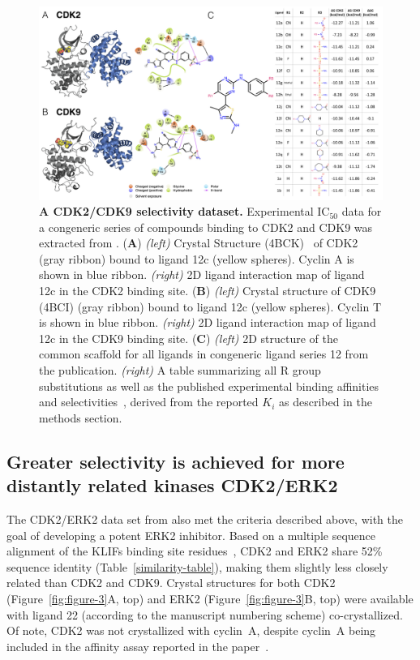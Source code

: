 \documentclass[phd,tocprelim]{cornell}
\begin{document}
\begin{landscape}
\begin{figure}[p]
\centering
	\includegraphics[width=1.0\linewidth]{figures/figure2.png}
	\caption[A CDK2/CDK9 selectivity dataset.]{{\bf A CDK2/CDK9 selectivity dataset.}
		Experimental IC$_{50}$ data for a congeneric series of compounds binding to CDK2 and CDK9 was extracted from \citet{Shao2013-oe}.
		({\bf A})  \emph{(left)} Crystal Structure (4BCK)~\citep{Hole2013-sr} of CDK2 (gray ribbon)  bound to ligand 12c (yellow spheres). 
		Cyclin A is shown in blue ribbon.
		\emph{(right)} 2D ligand interaction map of ligand 12c in the CDK2 binding site. 
		({\bf B}) \emph{(left)} Crystal structure of CDK9 (4BCI)\citep{Hole2013-sr} (gray ribbon) bound to ligand 12c (yellow spheres). 
		Cyclin T is shown in blue ribbon. 
		\emph{(right)} 2D ligand interaction map of ligand 12c in the CDK9 binding site.
		({\bf C}) \emph{(left)} 2D structure of the common scaffold for all ligands in congeneric ligand series 12 from the publication.
		\emph{(right)} A table summarizing all R group substitutions as well as the published experimental binding affinities and selectivities~\citep{Shao2013-oe}, derived from the reported $K_i$ as described in the methods section. 
	}
	\label{fig:figure-2}
\end{figure}
\end{landscape}

\subsection{Greater selectivity is achieved for more distantly related kinases CDK2/ERK2}
The CDK2/ERK2 data set from \citet{Blake2016-su} also met the criteria described above, with the goal of developing a potent ERK2 inhibitor. 
Based on a multiple sequence alignment of the KLIFs binding site residues~\cite{Kooistra:2016fr,vanLinden:2014ea}, CDK2 and ERK2 share 52\% sequence identity (Table~\ref{similarity-table}), making them slightly less closely related than CDK2 and CDK9. Crystal structures for both CDK2 (Figure~\ref{fig:figure-3}A, top) and ERK2 (Figure~\ref{fig:figure-3}B, top) were available with ligand 22 (according to the manuscript numbering scheme) co-crystallized. 
Of note, CDK2 was not crystallized with cyclin~A, despite cyclin~A being included in the affinity assay reported in the paper~\citep{Blake2016-su}. 
\end{document}
